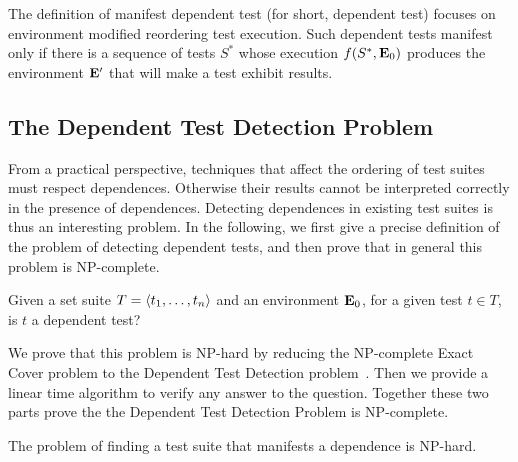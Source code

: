 The definition of manifest dependent test (for short, dependent test)
focuses on environment modified reordering test execution.
Such dependent tests  manifest only
if there is a sequence of tests $S^*$ whose execution
$f(S^*,\mathbf{E}_0)$  produces the
environment $\mathbf{E}'$ that will make a test exhibit results.


\subsection{The Dependent Test Detection Problem}

From a practical perspective, techniques that affect the ordering of
test suites must respect dependences. Otherwise their results cannot
be interpreted correctly in the presence of dependences. Detecting
dependences in existing test suites is thus an interesting problem.
In the following, we first give a precise definition of the problem of
detecting dependent tests, and then prove that in general this problem
is NP-complete. 


\begin{definition}
Given a set suite\/ $T =  \langle t_1, \dots, t_n \rangle $ and an environment\/
$\mathbf{E}_0$, for a given test\/ $t \in T$, is $t$ a dependent test?
\end{definition}

We prove that this problem is NP-hard by reducing the NP-complete Exact Cover problem
to the Dependent Test Detection
problem~\cite{karp:NP:1972}. 
Then we provide a linear time algorithm to verify any answer to the
question.
Together these two parts prove the the Dependent Test Detection Problem is NP-complete.

\begin{theorem}
The problem of finding a test suite that manifests a dependence is
NP-hard.
\end{theorem}

